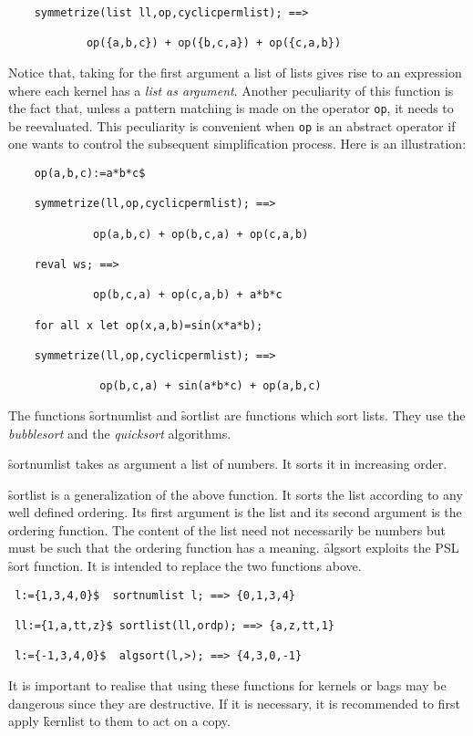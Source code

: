 \begin{itemize}
\begin{verbatim}
    symmetrize(list ll,op,cyclicpermlist); ==>

            op({a,b,c}) + op({b,c,a}) + op({c,a,b})
\end{verbatim}
Notice that, taking for the first argument a list of lists gives rise to
an expression where  each kernel has a \emph{list as argument}. Another
peculiarity of this function is the fact that, unless a pattern matching is
made on the operator \texttt{op}, it needs to be reevaluated. This peculiarity
is convenient when \texttt{op} is an abstract operator if one wants to 
control the subsequent simplification process. Here is an illustration:
\begin{verbatim}
    op(a,b,c):=a*b*c$

    symmetrize(ll,op,cyclicpermlist); ==>

             op(a,b,c) + op(b,c,a) + op(c,a,b)

    reval ws; ==>
                 
             op(b,c,a) + op(c,a,b) + a*b*c

    for all x let op(x,a,b)=sin(x*a*b);

    symmetrize(ll,op,cyclicpermlist); ==>

              op(b,c,a) + sin(a*b*c) + op(a,b,c)
\end{verbatim}
\hypertarget{operator:SORTNUMLIST}{}
\hypertarget{operator:SORTLIST}{}
The functions \f{sortnumlist} and \f{sortlist} are functions which sort
lists. They use the \emph{bubblesort} and the \emph{quicksort} algorithms.

\f{sortnumlist} takes as argument a list of numbers. It sorts it in
increasing order.

\f{sortlist} is a generalization of the above function.
It sorts the list according
to any well defined ordering. Its first argument is the list and its
second argument is the ordering function. The content of the list
need not necessarily be numbers but must be such that the ordering function
has a meaning.
\hypertarget{operator:ALGSORT}{}
\f{algsort} exploits the PSL \f{sort} function. It is intended to replace
the two functions above.
\begin{verbatim}
 l:={1,3,4,0}$  sortnumlist l; ==> {0,1,3,4}

 ll:={1,a,tt,z}$ sortlist(ll,ordp); ==> {a,z,tt,1}

 l:={-1,3,4,0}$  algsort(l,>); ==> {4,3,0,-1}
\end{verbatim}
It is important to realise that using these functions for kernels or bags
may be dangerous since they are destructive. If it is necessary, it is
recommended to first apply \f{kernlist} to them to act on a copy.


\end{itemize}
